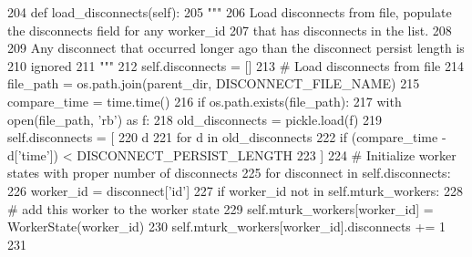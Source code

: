 \begin{DoxyCode}
204     \textcolor{keyword}{def }load\_disconnects(self):
205         \textcolor{stringliteral}{"""}
206 \textcolor{stringliteral}{        Load disconnects from file, populate the disconnects field for any worker\_id}
207 \textcolor{stringliteral}{        that has disconnects in the list.}
208 \textcolor{stringliteral}{}
209 \textcolor{stringliteral}{        Any disconnect that occurred longer ago than the disconnect persist length is}
210 \textcolor{stringliteral}{        ignored}
211 \textcolor{stringliteral}{        """}
212         self.disconnects = []
213         \textcolor{comment}{# Load disconnects from file}
214         file\_path = os.path.join(parent\_dir, DISCONNECT\_FILE\_NAME)
215         compare\_time = time.time()
216         \textcolor{keywordflow}{if} os.path.exists(file\_path):
217             with open(file\_path, \textcolor{stringliteral}{'rb'}) \textcolor{keyword}{as} f:
218                 old\_disconnects = pickle.load(f)
219                 self.disconnects = [
220                     d
221                     \textcolor{keywordflow}{for} d \textcolor{keywordflow}{in} old\_disconnects
222                     \textcolor{keywordflow}{if} (compare\_time - d[\textcolor{stringliteral}{'time'}]) < DISCONNECT\_PERSIST\_LENGTH
223                 ]
224         \textcolor{comment}{# Initialize worker states with proper number of disconnects}
225         \textcolor{keywordflow}{for} disconnect \textcolor{keywordflow}{in} self.disconnects:
226             worker\_id = disconnect[\textcolor{stringliteral}{'id'}]
227             \textcolor{keywordflow}{if} worker\_id \textcolor{keywordflow}{not} \textcolor{keywordflow}{in} self.mturk\_workers:
228                 \textcolor{comment}{# add this worker to the worker state}
229                 self.mturk\_workers[worker\_id] = WorkerState(worker\_id)
230             self.mturk\_workers[worker\_id].disconnects += 1
231 
\end{DoxyCode}
\mbox{\label{classparlai_1_1mturk_1_1core_1_1legacy__2018_1_1worker__manager_1_1WorkerManager_a8ad270c9bc69faf5e24dd2144f0635d4}} 
